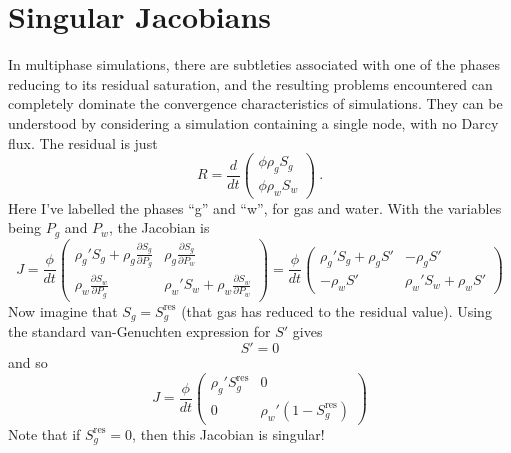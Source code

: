 \documentclass[]{scrreprt}
\begin{document}
\chapter{Singular Jacobians}
\label{chap.sing.jac}

In multiphase simulations, there are subtleties associated with one of
the phases reducing to its residual saturation, and the resulting
problems encountered can completely dominate the convergence
characteristics of simulations.  They can be understood by considering
a simulation containing a single node, with no Darcy flux.  The
residual is just
\begin{equation}
R = \frac{d}{dt}\left(
\begin{array}{l}
\phi \rho_{g}S_{g} \\
\phi \rho_{w}S_{w}
\end{array}
\right) \ .
\end{equation}
Here I've labelled the phases ``g'' and ``w'', for gas and water.
With the variables being $P_{g}$ and $P_{w}$, the
Jacobian is
\begin{equation}
J = \frac{\phi}{dt} \left(
\begin{array}{cc}
\rho_{g}'S_{g} + \rho_{g}\frac{\partial S_{g}}{\partial P_{g}} &
\rho_{g}\frac{\partial S_{g}}{\partial P_{w}} \\
\rho_{w}\frac{\partial S_{w}}{\partial P_{g}} &
\rho_{w}'S_{w} + \rho_{w}\frac{\partial S_{w}}{\partial P_{w}}
\end{array}
\right)
= \frac{\phi}{dt} \left(
\begin{array}{cc}
\rho_{g}'S_{g} + \rho_{g}S' &
-\rho_{g}S' \\
-\rho_{w}S' & 
\rho_{w}'S_{w} + \rho_{w}S'
\end{array}
\right)
\end{equation}
Now imagine that $S_{g} = S_{g}^{\mathrm{res}}$ (that gas has reduced
to the residual value).  Using the standard van-Genuchten expression
for $S'$ gives
\begin{equation}
S' = 0
\end{equation}
and so
\begin{equation}
J = \frac{\phi}{dt} \left(
\begin{array}{cc}
\rho_{g}'S_{g}^{\mathrm{res}}  &
0 \\
0 & 
\rho_{w}'(1 - S_{g}^{\mathrm{res}})
\end{array}
\right)
\end{equation}
Note that if $S_{g}^{\mathrm{res}}=0$, then this Jacobian is singular!
\end{document}
